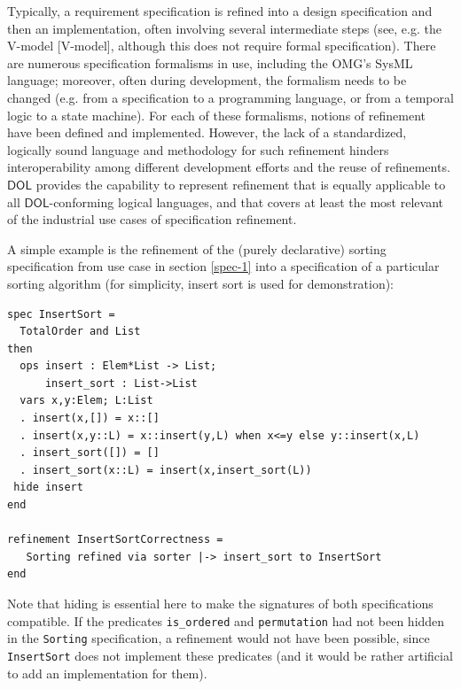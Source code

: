\documentclass[10pt,fleqn,final]{scrreprt}
\newcommand{\cbs}[0]{\color{red}\xspace} %
\newcommand{\cbe}[0]{\color{black}\xspace} %
\newcommand*{\DOL}{\ensuremath{\mathsf{DOL}}\xspace}
\newenvironment{definitions}[0]{\medskip }{}
\begin{document}
\begin{definitions}
Typically, a requirement specification is refined into a
design specification and then an implementation, often involving
several intermediate steps (see, e.g. the V-model [V-model], although
this does not require formal specification).  There are numerous
specification formalisms in use, including the OMG's SysML language;
moreover, often during development, the formalism needs to be changed
(e.g. from a specification to a programming language, or from a
temporal logic to a state machine). For each of these formalisms,
notions of refinement have been defined and implemented. However, the
lack of a standardized, logically sound language and methodology for
such refinement hinders interoperability among different development
efforts and the reuse of refinements.  \DOL provides the capability to
represent refinement that is equally applicable to all \DOL-conforming
logical languages, and that covers at least the most relevant of the
industrial use cases of specification refinement.

A simple example is the refinement of the (purely declarative) sorting
specification from use case in section \ref{spec-1} into a specification of a particular sorting
algorithm (for simplicity,\cbs insert sort is used for demonstration):\cbe

\begin{lstlisting}[basicstyle=\ttfamily\footnotesize,language=dolText,morekeywords={sort, ops, refinement, free,spec type, assoc, unit,props,op,spec,refined, via,generated, then,ObjectProperty,Class,DisjointUnionOf,SubClassOf,Characteristics,Transitive,Asymmetric,SubPropertyOf,DisjointClasses,EquivalentTo,inverse,only,forall,iff,if,or,exists,distributed,from},escapechar=@,mathescape]	
spec InsertSort = 
  TotalOrder and List
then
  ops insert : Elem*List -> List;
      insert_sort : List->List
  vars x,y:Elem; L:List
  . insert(x,[]) = x::[]
  . insert(x,y::L) = x::insert(y,L) when x<=y else y::insert(x,L)
  . insert_sort([]) = []
  . insert_sort(x::L) = insert(x,insert_sort(L))
 hide insert
end

refinement InsertSortCorrectness =
   Sorting refined via sorter |-> insert_sort to InsertSort
end
\end{lstlisting}
Note that hiding is essential here to make the signatures of
both specifications compatible.\cbs If  the
predicates \texttt{is\_ordered} and \texttt{permutation}
had not been hidden\cbe in the \texttt{Sorting} specification, a refinement would
not have been possible, since \texttt{InsertSort} does not
implement these predicates (and it would be rather artificial
to add an implementation for them).


\end{definitions}
\end{document}
